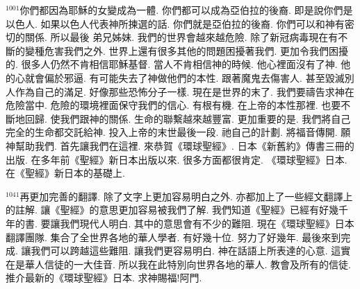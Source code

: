 \documentclass{book}
\begin{document}
$^{1001}$你們都因為耶穌的女變成為一體.
你們都可以成為亞伯拉的後裔.
即是說你們是以色人.
如果以色人代表神所揀選的話.
你們就是亞伯拉的後裔.
你們可以和神有密切的關係.
所以最後 弟兄姊妹.
我們的世界會越來越危險.
除了新冠病毒現在有不斷的變種危害我們之外.
世界上還有很多其他的問題困擾著我們.
更加令我們困擾的.
很多人仍然不肯相信耶穌基督.
當人不肯相信神的時候.
他心裡面沒有了神.
他的心就會偏於邪逼.
有可能失去了神做他們的本性.
跟著魔鬼去傷害人.
甚至毀滅別人作為自己的滿足.
好像那些恐怖分子一樣.
現在是世界的末了.
我們要禱告求神在危險當中.
危險的環境裡面保守我們的信心.
有根有機.
在上帝的本性那裡.
也要不斷地回歸.
使我們跟神的關係.
生命的聯繫越來越豐富.
更加重要的是.
我們將自己完全的生命都交託給神.
投入上帝的末世最後一段.
祂自己的計劃.
將福音傳開.
願神幫助我們.
首先讓我們在這裡.
來恭賀《環球聖經》.
日本《新舊約》傳書三冊的出版.
在多年前《聖經》新日本出版以來.
很多方面都很肯定.
《環球聖經》日本.
在《聖經》新日本的基礎上.

$^{1041}$再更加完善的翻譯.
除了文字上更加容易明白之外.
亦都加上了一些經文翻譯上的註解.
讓《聖經》的意思更加容易被我們了解.
我們知道《聖經》已經有好幾千年的書.
要讓我們現代人明白.
其中的意思會有不少的難阻.
現在《環球聖經》日本翻譯團隊.
集合了全世界各地的華人學者.
有好幾十位.
努力了好幾年.
最後來到完成.
讓我們可以跨越這些難阻.
讓我們更容易明白.
神在話語上所表達的心意.
這實在是華人信徒的一大佳音.
所以我在此特別向世界各地的華人.
教會及所有的信徒.
推介最新的《環球聖經》日本.
求神賜福!阿門.
\newpage
\end{document}
